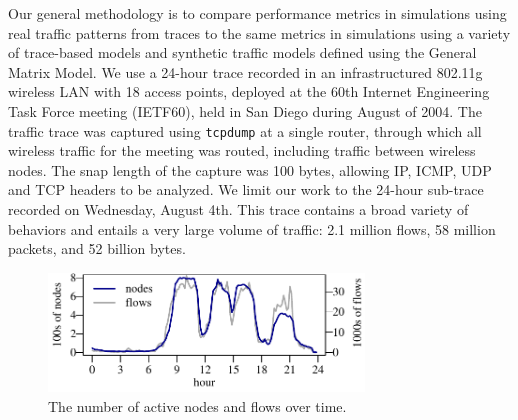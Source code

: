\documentclass[twocolumn,final]{svjour3}
\newcommand{\caps}[1]{{\small{#1}}}
\begin{document}
Our general methodology is to compare performance metrics in simulations using real traffic patterns from traces to the same metrics in simulations using a variety of trace-based models and synthetic traffic models defined using the General Matrix Model. We use a 24-hour trace recorded in an infrastructured 802.11g wireless \caps{LAN} with 18 access points, deployed at the 60th Internet Engineering Task Force meeting (\caps{IETF}60), held in San Diego during August of 2004. The traffic trace was captured using \texttt{\small{tcpdump}} at a single router, through which all wireless traffic for the meeting was routed, including traffic between wireless nodes. The snap length of the capture was 100 bytes, allowing \caps{IP}, \caps{ICMP}, \caps{UDP} and \caps{TCP} headers to be analyzed. We limit our work to the 24-hour sub-trace recorded on Wednesday, August 4th. This trace contains a broad variety of behaviors and entails a very large volume of traffic: 2.1 million flows, 58 million packets, and 52 billion bytes.

\begin{figure}[t]
\vspace{0.5em}
\begin{center}
\includegraphics[width=3.3in]{nodes-flows}%
\vspace{-1.25em}%
\caption{The number of active nodes and flows over time.} 
\label{fig:nodes-flows}
\end{center}
\vspace{-2em}
\end{figure}
\end{document}
